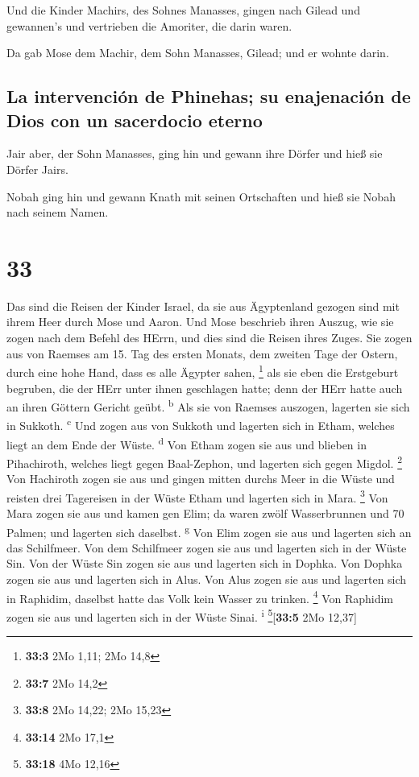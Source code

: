  Und die Kinder Machirs, des Sohnes Manasses, gingen nach
Gilead und gewannen's und vertrieben die Amoriter, die darin waren.

 Da gab Mose dem Machir, dem Sohn Manasses, Gilead; und
er wohnte darin.

\hypertarget{la-intervenciuxf3n-de-phinehas-su-enajenaciuxf3n-de-dios-con-un-sacerdocio-eterno}{%
\subsection{La intervención de Phinehas; su enajenación de Dios con un
sacerdocio
eterno}\label{la-intervenciuxf3n-de-phinehas-su-enajenaciuxf3n-de-dios-con-un-sacerdocio-eterno}}

 Jair aber, der Sohn Manasses, ging hin und gewann ihre
Dörfer und hieß sie Dörfer Jairs.

 Nobah ging hin und gewann Knath mit seinen Ortschaften
und hieß sie Nobah nach seinem Namen.

\hypertarget{section-32}{%
\section{33}\label{section-32}}

 Das sind die Reisen der Kinder Israel, da sie aus
Ägyptenland gezogen sind mit ihrem Heer durch Mose und Aaron.
 Und Mose beschrieb ihren Auszug, wie sie zogen nach dem
Befehl des HErrn, und dies sind die Reisen ihres Zuges. 
Sie zogen aus von Raemses am 15. Tag des ersten Monats, dem zweiten Tage
der Ostern, durch eine hohe Hand, dass es alle Ägypter sahen,
\footnote{\textbf{33:3} 2Mo 1,11; 2Mo 14,8}  als sie eben
die Erstgeburt begruben, die der HErr unter ihnen geschlagen hatte; denn
der HErr hatte auch an ihren Göttern Gericht geübt. \textsuperscript{b}
 Als sie von Raemses auszogen, lagerten sie sich in
Sukkoth. \textsuperscript{c}  Und zogen aus von Sukkoth
und lagerten sich in Etham, welches liegt an dem Ende der Wüste.
\textsuperscript{d}  Von Etham zogen sie aus und blieben
in Pihachiroth, welches liegt gegen Baal-Zephon, und lagerten sich gegen
Migdol. \footnote{\textbf{33:7} 2Mo 14,2}  Von Hachiroth
zogen sie aus und gingen mitten durchs Meer in die Wüste und reisten
drei Tagereisen in der Wüste Etham und lagerten sich in Mara.
\footnote{\textbf{33:8} 2Mo 14,22; 2Mo 15,23}  Von Mara
zogen sie aus und kamen gen Elim; da waren zwölf Wasserbrunnen und 70
Palmen; und lagerten sich daselbst. \textsuperscript{g} 
Von Elim zogen sie aus und lagerten sich an das Schilfmeer.
 Von dem Schilfmeer zogen sie aus und lagerten sich in
der Wüste Sin.  Von der Wüste Sin zogen sie aus und
lagerten sich in Dophka.  Von Dophka zogen sie aus und
lagerten sich in Alus.  Von Alus zogen sie aus und
lagerten sich in Raphidim, daselbst hatte das Volk kein Wasser zu
trinken. \footnote{\textbf{33:14} 2Mo 17,1}  Von Raphidim
zogen sie aus und lagerten sich in der Wüste Sinai. \textsuperscript{i}
\footnote{\textbf{33:18} 4Mo 12,16}{[}\textbf{33:5} 2Mo 12,37{]}

